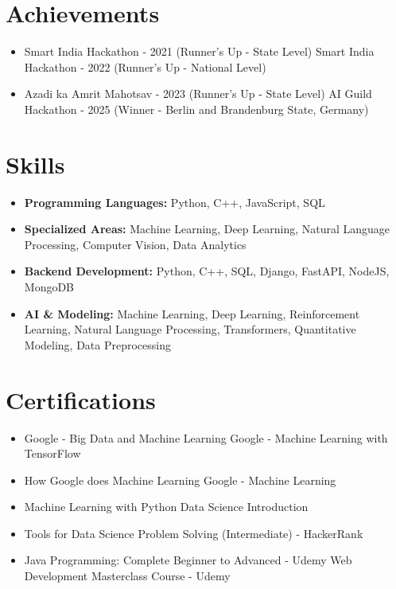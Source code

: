 \documentclass[a4paper,10pt]{article}
\begin{document}
\section*{Achievements}
\begin{itemize}
\item Smart India Hackathon - 2021 (Runner's Up - State Level) \hfill Smart India Hackathon - 2022 (Runner's Up - National Level)
\item Azadi ka Amrit Mahotsav - 2023 (Runner's Up - State Level) \hfill AI Guild Hackathon - 2025 (Winner - Berlin and Brandenburg State, Germany)
\end{itemize}

\section*{Skills}
\begin{itemize}
  \item \textbf{Programming Languages:} Python, C++, JavaScript, SQL
  \item \textbf{Specialized Areas:} Machine Learning, Deep Learning, Natural Language Processing, Computer Vision, Data Analytics
  \item \textbf{Backend Development:} Python, C++, SQL, Django, FastAPI, NodeJS, MongoDB
  \item \textbf{AI \& Modeling:} Machine Learning, Deep Learning, Reinforcement Learning, Natural Language Processing, Transformers, Quantitative Modeling, Data Preprocessing
\end{itemize}

\section*{Certifications}
\begin{itemize}
\item Google - Big Data and Machine Learning \hfill Google - Machine Learning with TensorFlow
\item How Google does Machine Learning \hfill Google - Machine Learning
\item Machine Learning with Python \hfill Data Science Introduction
\item Tools for Data Science \hfill Problem Solving (Intermediate) - HackerRank
\item Java Programming: Complete Beginner to Advanced - Udemy \hfill Web Development Masterclass Course - Udemy
\end{itemize}
\end{document}

